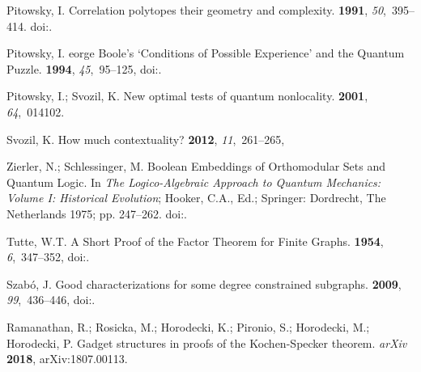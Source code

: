 \begin{thebibliography}{999}
Pitowsky, I.
\newblock Correlation polytopes their geometry and complexity.
 {\bf 1991}, {\em 50},~395--414.
\newblock
 doi:{\href{https://doi.org/10.1007/BF01594946}{}}.

Pitowsky, I.
eorge {B}oole's `Conditions of Possible Experience' and the
 Quantum Puzzle.
 {\bf 1994},
 {\em 45},~95--125,
\newblock
 doi:{\href{https://doi.org/10.1093/bjps/45.1.95}{}}.

Pitowsky, I.; Svozil, K.
\newblock New optimal tests of quantum nonlocality.
 {\bf 2001}, {\em 64},~014102.

Svozil, K.
\newblock How much contextuality?
 {\bf 2012}, {\em 11},~261--265,

Zierler, N.; Schlessinger, M.
\newblock Boolean Embeddings of Orthomodular Sets and Quantum Logic.
\newblock In {\em The Logico-Algebraic Approach to Quantum Mechanics: Volume I:
 Historical Evolution}; Hooker, C.A., Ed.; Springer: Dordrecht, The Netherlands
 1975; pp. 247--262.
\newblock
 doi:{\href{https://doi.org/10.1007/978-94-010-1795-4_14}{}}.

Tutte, W.T.
\newblock A Short Proof of the Factor Theorem for Finite Graphs.
 {\bf 1954}, {\em 6},~347--352,
\newblock
 doi:{\href{https://doi.org/10.4153/CJM-1954-033-3}{}}.

Szab\'o, J.
\newblock Good characterizations for some degree constrained subgraphs.
 {\bf 2009}, {\em
 99},~436--446,
\newblock
 doi:{\href{https://doi.org/10.1016/j.jctb.2008.08.009}{}}.

Ramanathan, R.; Rosicka, M.; Horodecki, K.; Pironio, S.; Horodecki, M.;
 Horodecki, P.
\newblock Gadget structures in proofs of the {K}ochen-{S}pecker theorem. \emph{arXiv} \textbf{2018}, arXiv:1807.00113.


\end{thebibliography}
